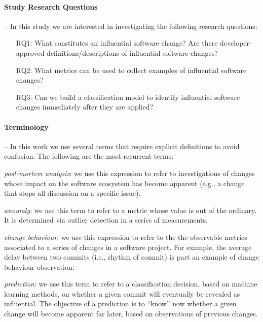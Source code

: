 \paragraph*{\bf Study Research Questions} -- In this study we are interested in investigating the following research questions:
\begin{itemize}
\itemsep0em
	\item[RQ1:] What constitutes an influential software change? Are there developer-approved definitions/descriptions of influential software changes?
	\item[RQ2:] What metrics can be used to collect examples of influential software changes?
	\item[RQ3:] Can we build a classification model to identify influential software changes immediately after they are applied?
\end{itemize}


\paragraph*{\bf Terminology} -- In this work we use several terms that require explicit definitions to avoid confusion. The following are the most recurrent terms:

{\em post-mortem analysis}: we use this expression to refer to investigations of changes whose impact on the software ecosystem has become apparent (e.g., a change that stops all discussion on a specific issue).

{\em anomaly}: we use this term to refer to a metric whose value is out of the ordinary. It is determined via outlier detection in a series of measurements. 

{\em change behaviour}: we use this expression to refer to the the observable metrics associated to a series of changes in a software project. For example, the average delay between two commits (i.e., rhythm of commit) is part an example of change behaviour observation.

{\em prediction}: we use this term to refer to a classification decision, based on machine learning methods, on whether a given commit will eventually be revealed as influential. The objective of a prediction is to ``know'' now whether a given change will become apparent far later, based on observations of previous changes.
 

